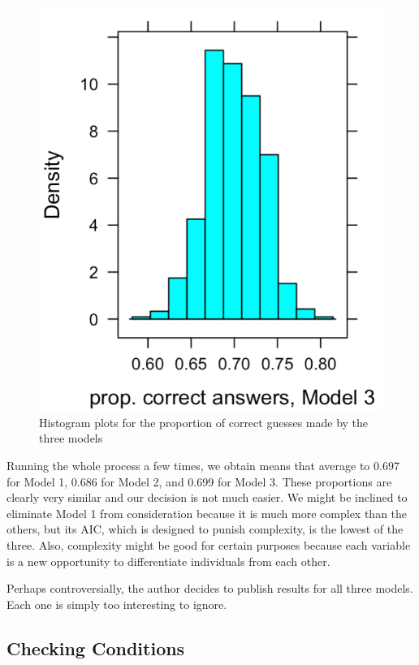 \begin{figure}[h]
    \includegraphics[scale=.45]{histplot_propcorrect3.png}
    \caption{Histogram plots for the proportion of correct guesses made by the three models}
    \label{fig:train_histplots}
\end{figure}

\par \bigskip Running the whole process a few times, we obtain means that average to 0.697 for Model 1, 0.686 for Model 2, and 0.699 for Model 3. These proportions are clearly very similar and our decision is not much easier. We might be inclined to eliminate Model 1 from consideration because it is much more complex than the others, but its AIC, which is designed to punish complexity, is the lowest of the three. Also, complexity might be good for certain purposes because each variable is a new opportunity to differentiate individuals from each other.

\par \bigskip Perhaps controversially, the author decides to publish results for all three models. Each one is simply too interesting to ignore.

\subsection{Checking Conditions}

